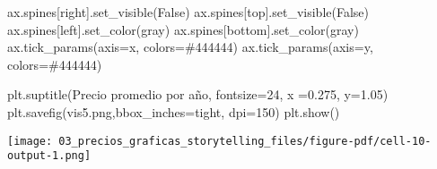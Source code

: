 \documentclass[
  letterpaper,
  DIV=11,
  numbers=noendperiod]{scrreprt}
\newenvironment{Shaded}{\begin{snugshade}}{\end{snugshade}}
\newcommand{\DecValTok}[1]{\textcolor[rgb]{0.68,0.00,0.00}{#1}}
\newcommand{\FloatTok}[1]{\textcolor[rgb]{0.68,0.00,0.00}{#1}}
\newcommand{\NormalTok}[1]{\textcolor[rgb]{0.00,0.23,0.31}{#1}}
\newcommand{\OperatorTok}[1]{\textcolor[rgb]{0.37,0.37,0.37}{#1}}
\newcommand{\StringTok}[1]{\textcolor[rgb]{0.13,0.47,0.30}{#1}}
\newcommand{\VariableTok}[1]{\textcolor[rgb]{0.07,0.07,0.07}{#1}}
\begin{document}
\begin{Shaded}
\begin{Highlighting}[]
\NormalTok{ax.spines[}\StringTok{\textquotesingle{}right\textquotesingle{}}\NormalTok{].set\_visible(}\VariableTok{False}\NormalTok{)}
\NormalTok{ax.spines[}\StringTok{\textquotesingle{}top\textquotesingle{}}\NormalTok{].set\_visible(}\VariableTok{False}\NormalTok{)}
\NormalTok{ax.spines[}\StringTok{\textquotesingle{}left\textquotesingle{}}\NormalTok{].set\_color(}\StringTok{\textquotesingle{}gray\textquotesingle{}}\NormalTok{)}
\NormalTok{ax.spines[}\StringTok{\textquotesingle{}bottom\textquotesingle{}}\NormalTok{].set\_color(}\StringTok{\textquotesingle{}gray\textquotesingle{}}\NormalTok{)}
\NormalTok{ax.tick\_params(axis}\OperatorTok{=}\StringTok{\textquotesingle{}x\textquotesingle{}}\NormalTok{, colors}\OperatorTok{=}\StringTok{\textquotesingle{}\#444444\textquotesingle{}}\NormalTok{)}
\NormalTok{ax.tick\_params(axis}\OperatorTok{=}\StringTok{\textquotesingle{}y\textquotesingle{}}\NormalTok{, colors}\OperatorTok{=}\StringTok{\textquotesingle{}\#444444\textquotesingle{}}\NormalTok{)}

\NormalTok{plt.suptitle(}\StringTok{\textquotesingle{}Precio promedio por año\textquotesingle{}}\NormalTok{, fontsize}\OperatorTok{=}\DecValTok{24}\NormalTok{, x }\OperatorTok{=}\FloatTok{0.275}\NormalTok{, y}\OperatorTok{=}\FloatTok{1.05}\NormalTok{)}
\NormalTok{plt.savefig(}\StringTok{\textquotesingle{}vis5.png\textquotesingle{}}\NormalTok{,bbox\_inches}\OperatorTok{=}\StringTok{\textquotesingle{}tight\textquotesingle{}}\NormalTok{, dpi}\OperatorTok{=}\DecValTok{150}\NormalTok{)}
\NormalTok{plt.show()}
\end{Highlighting}
\end{Shaded}

\texttt{[image: 03\_precios\_graficas\_storytelling\_files/figure-pdf/cell-10-output-1.png]}
\end{document}
